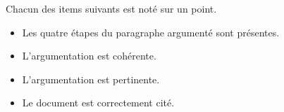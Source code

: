 \documentclass[11pt]{article}
\begin{document}
\noindent Chacun des items suivants est noté sur un point.

\begin{itemize}[$\ldots/1$]
\item Les quatre étapes du paragraphe argumenté sont présentes.
\item L'argumentation est cohérente.
\item L'argumentation est pertinente.
\item Le document est correctement cité.
\end{itemize}
\end{document}
